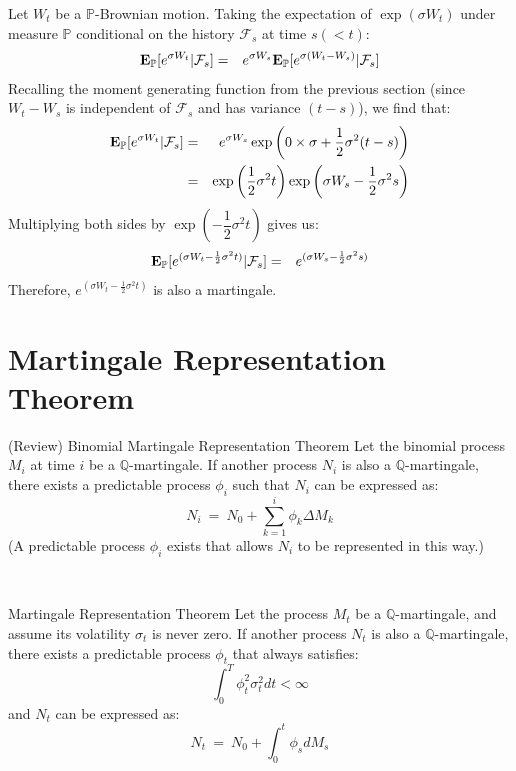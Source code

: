 \documentclass[uplatex,a4j,12pt,dvipdfmx]{jsarticle}
\begin{document}
Let $W_{t}$ be a $\mathbb{P}$-Brownian motion. Taking the expectation of $\exp(\sigma W_{t})$ under measure $\mathbb{P}$ conditional on the history $\mathcal{F}_{s}$ at time $s(<t)$:
%
\begin{eqnarray*}
	{\bf E}_{\mathbb{P}}[ e^{\sigma W_{t}} | \mathcal{F}_{s} ]
	&=&
	e^{\sigma W_{s}}
		{\bf E}_{\mathbb{P}}[ e^{\sigma (W_{t} -W_{s})} | \mathcal{F}_{s} ]
\end{eqnarray*}
%
Recalling the moment generating function from the previous section (since $W_{t} - W_{s}$ is independent of $\mathcal{F}_{s}$ and has variance $(t-s)$), we find that:
%
\begin{eqnarray*}
	{\bf E}_{\mathbb{P}}[ e^{\sigma W_{t}} | \mathcal{F}_{s} ]
	&=&
	e^{\sigma W_{s}}
	\exp \left( 0 \times \sigma + \dfrac{1}{2} \sigma^{2} (t-s) \right)
	\\ &=&
	\exp \left( \dfrac{1}{2} \sigma^{2} t \right)
	\exp \left( \sigma W_{s} - \dfrac{1}{2} \sigma^{2} s \right)
\end{eqnarray*}
%
Multiplying both sides by $\exp \left( - \dfrac{1}{2} \sigma^{2} t \right)$ gives us:
%
\begin{eqnarray*}
	{\bf E}_{\mathbb{P}}[ e^{ ( \sigma W_{t} - \frac{1}{2} \sigma^{2} t ) } | \mathcal{F}_{s} ]
	&=&
	e^{ ( \sigma W_{s} - \frac{1}{2} \sigma^{2} s ) }
\end{eqnarray*}
%
Therefore, $e^{ ( \sigma W_{t} - \frac{1}{2} \sigma^{2} t ) }$ is also a martingale.
\section{Martingale Representation Theorem}
%
\begin{itembox}[l]{(Review) Binomial Martingale Representation Theorem}
	Let the binomial process $M_{i}$ at time $i$ be a $\mathbb{Q}$-martingale. If another process $N_{i}$ is also a $\mathbb{Q}$-martingale, there exists a predictable process $\phi_{i}$ such that $N_{i}$ can be expressed as:
	$$
		N_{i} \ = \ N_{0} + \sum_{k=1}^{i} \phi_{k} \Delta M_{k}
	$$
	(A predictable process $\phi_{i}$ exists that allows $N_{i}$ to be represented in this way.)
\end{itembox}
%

\
%
\begin{itembox}[l]{Martingale Representation Theorem}
	Let the process $M_{t}$ be a $\mathbb{Q}$-martingale, and assume its volatility $\sigma_{t}$ is never zero. If another process $N_{t}$ is also a $\mathbb{Q}$-martingale, there exists a predictable process $\phi_{t}$ that always satisfies:
	$$
		\int^{T}_{0} \phi_{t}^{2} \sigma_{t}^{2} d t < \infty
	$$
	and $N_{t}$ can be expressed as:
	$$
		N_{t} \ = \ N_{0} + \int^{t}_{0} \phi_{s} d M_{s}
	$$
\end{itembox}
%
\end{document}
